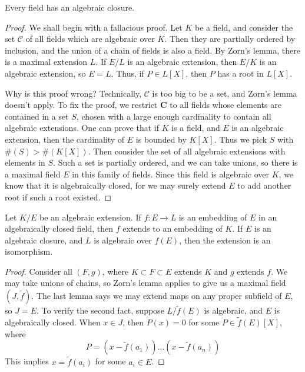 \begin{theorem}
    Every field has an algebraic closure.
\end{theorem}
\begin{proof}
    We shall begin with a fallacious proof. Let $K$ be a field, and consider the set $\mathcal{C}$ of all fields which are algebraic over $K$. Then they are partially ordered by inclusion, and the union of a chain of fields is also a field. By Zorn's lemma, there is a maximal extension $L$. If $E/L$ is an algebraic extension, then $E/K$ is an algebraic extension, so $E = L$. Thus, if $P \in L[X]$, then $P$ has a root in $L[X]$.

    Why is this proof wrong? Technically, $\mathcal{C}$ is too big to be a set, and Zorn's lemma doesn't apply. To fix the proof, we restrict $\mathbf{C}$ to all fields whose elements are contained in a set $S$, chosen with a large enough cardinality to contain all algebraic extensions. One can prove that if $K$ is a field, and $E$ is an algebraic extension, then the cardinality of $E$ is bounded by $K[X]$. Thus we pick $S$ with $\#(S) > \#(K[X])$. Then consider the set of all algebraic extensions with elements in $S$. Such a set is partially ordered, and we can take unions, so there is a maximal field $E$ in this family of fields. Since this field is algebraic over $K$, we know that it is algebraically closed, for we may surely extend $E$ to add another root if such a root existed.
\end{proof}

\begin{theorem}
    Let $K/E$ be an algebraic extension. If $f:E \to L$ is an embedding of $E$ in an algebraically closed field, then $f$ extends to an embedding of $K$. If $E$ is an algebraic closure, and $L$ is algebraic over $f(E)$, then the extension is an isomorphism.
\end{theorem}
\begin{proof}
    Consider all $(F,g)$, where $K \subset F \subset E$ extends $K$ and $g$ extends $f$. We may take unions of chains, so Zorn's lemma applies to give us a maximal field $(J,\tilde{f})$. The last lemma says we may extend maps on any proper subfield of $E$, so $J = E$. To verify the second fact, suppose $L/\tilde{f}(E)$ is algebraic, and $E$ is algebraically closed. When $x \in J$, then $P(x) = 0$ for some $P \in \tilde{f}(E)[X]$, where
    \[ P = (x - \tilde{f}(a_1)) \dots (x - \tilde{f}(a_n)) \]
    This implies $x = \tilde{f}(a_i)$ for some $a_i \in E$.
\end{proof}

